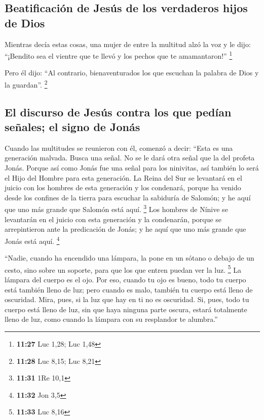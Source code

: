 \begin{paracol}{2}
\hypertarget{beatificaciuxf3n-de-jesuxfas-de-los-verdaderos-hijos-de-dios}{%
\subsection{Beatificación de Jesús de los verdaderos hijos de
Dios}\label{beatificaciuxf3n-de-jesuxfas-de-los-verdaderos-hijos-de-dios}}

 Mientras decía estas cosas, una mujer de entre la
multitud alzó la voz y le dijo: ``¡Bendito sea el vientre que te llevó y
los pechos que te amamantaron!'' \footnote{\textbf{11:27} Luc 1,28; Luc
  1,48}

 Pero él dijo: ``Al contrario, bienaventurados los que
escuchan la palabra de Dios y la guardan''. \footnote{\textbf{11:28} Luc
  8,15; Luc 8,21}

\hypertarget{el-discurso-de-jesuxfas-contra-los-que-peduxedan-seuxf1ales-el-signo-de-jonuxe1s}{%
\subsection{El discurso de Jesús contra los que pedían señales; el signo
de
Jonás}\label{el-discurso-de-jesuxfas-contra-los-que-peduxedan-seuxf1ales-el-signo-de-jonuxe1s}}

 Cuando las multitudes se reunieron con él, comenzó a
decir: ``Esta es una generación malvada. Busca una señal. No se le dará
otra señal que la del profeta Jonás.  Porque así como
Jonás fue una señal para los ninivitas, así también lo será el Hijo del
Hombre para esta generación.  La Reina del Sur se
levantará en el juicio con los hombres de esta generación y los
condenará, porque ha venido desde los confines de la tierra para
escuchar la sabiduría de Salomón; y he aquí que uno más grande que
Salomón está aquí. \footnote{\textbf{11:31} 1Re 10,1} 
Los hombres de Nínive se levantarán en el juicio con esta generación y
la condenarán, porque se arrepintieron ante la predicación de Jonás; y
he aquí que uno más grande que Jonás está aquí. \footnote{\textbf{11:32}
  Jon 3,5}

 ``Nadie, cuando ha encendido una lámpara, la pone en un
sótano o debajo de un cesto, sino sobre un soporte, para que los que
entren puedan ver la luz. \footnote{\textbf{11:33} Luc 8,16}
 La lámpara del cuerpo es el ojo. Por eso, cuando tu ojo
es bueno, todo tu cuerpo está también lleno de luz; pero cuando es malo,
también tu cuerpo está lleno de oscuridad.  Mira, pues,
si la luz que hay en ti no es oscuridad.  Si, pues, todo
tu cuerpo está lleno de luz, sin que haya ninguna parte oscura, estará
totalmente lleno de luz, como cuando la lámpara con su resplandor te
alumbra.''


\end{paracol}
